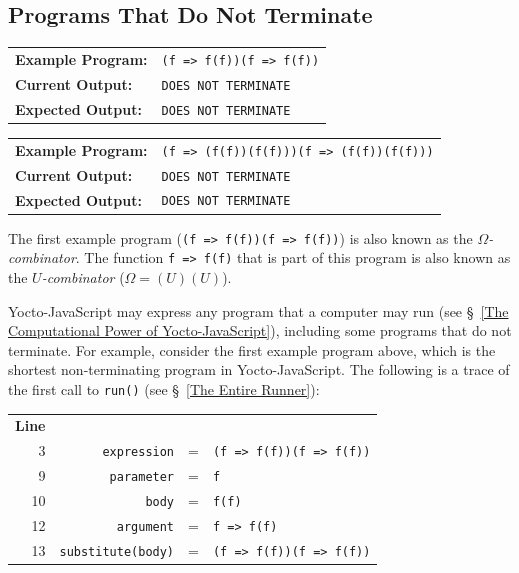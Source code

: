 \documentclass[12pt, oneside]{book}
\begin{document}
\subsection{Programs That Do Not Terminate}
\label{Programs That Do Not Terminate}

\begin{center}
\begin{tabular}{ll}
\textbf{Example Program:} & \texttt{(f => f(f))(f => f(f))} \\
\textbf{Current Output:} & \texttt{DOES NOT TERMINATE} \\
\textbf{Expected Output:} & \texttt{DOES NOT TERMINATE} \\
\end{tabular}
\end{center}

\begin{center}
\begin{tabular}{ll}
\textbf{Example Program:} & \texttt{(f => (f(f))(f(f)))(f => (f(f))(f(f)))} \\
\textbf{Current Output:} & \texttt{DOES NOT TERMINATE} \\
\textbf{Expected Output:} & \texttt{DOES NOT TERMINATE} \\
\end{tabular}
\end{center}

\begin{mdframed}[frametitle = {Technical Terms}]
The first example program (\texttt{(f => f(f))(f => f(f))}) is also known as the \emph{$\Omega$-combinator}. The function \texttt{f => f(f)} that is part of this program is also known as the \emph{$U$-combinator} ($\Omega = (U)(U)$).
\end{mdframed}

Yocto-JavaScript may express any program that a computer may run (see §~\ref{The Computational Power of Yocto-JavaScript}), including some programs that do not terminate. For example, consider the first example program above, which is the shortest non-terminating program in Yocto-JavaScript. The following is a trace of the first call to \texttt{run()} (see §~\ref{The Entire Runner}):

\begin{center}
\begin{tabular}{rrcl}
\textbf{Line}&&&\\
3 & \texttt{expression} & = & \texttt{(f => f(f))(f => f(f))}\\
9 & \texttt{parameter} & = & \texttt{f}\\
10 & \texttt{body} & = & \texttt{f(f)}\\
12 & \texttt{argument} & = & \texttt{f => f(f)}\\
13 & \texttt{substitute(body)} & = & \texttt{(f => f(f))(f => f(f))}\\
\end{tabular}
\end{center}
\end{document}
